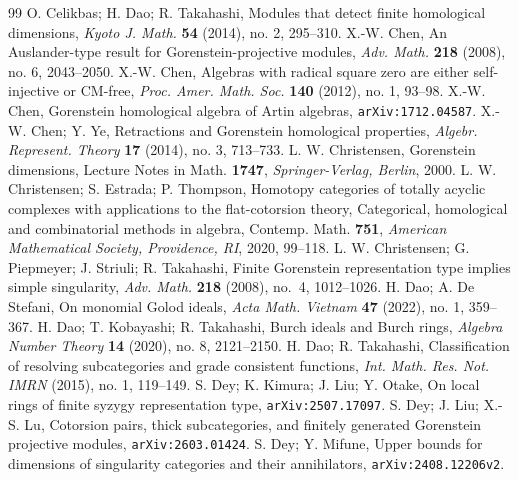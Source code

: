 \documentclass{amsart}
\theoremstyle{definition}
\theoremstyle{remark}
\numberwithin{equation}{thm}
\begin{document}
\begin{thebibliography}{99}
{\sc O. Celikbas; H. Dao; R. Takahashi}, Modules that detect finite homological dimensions, {\it Kyoto J. Math.} {\bf 54} (2014), no. 2, 295--310.
{\sc X.-W. Chen}, An Auslander-type result for Gorenstein-projective modules, {\it Adv. Math.} {\bf 218} (2008), no. 6, 2043--2050.
{\sc X.-W. Chen}, Algebras with radical square zero are either self-injective or CM-free, {\em Proc. Amer. Math. Soc.} {\bf 140} (2012), no. 1, 93--98.
{\sc X.-W. Chen}, Gorenstein homological algebra of Artin algebras, {\tt arXiv:1712.04587}.
{\sc X.-W. Chen; Y. Ye}, Retractions and Gorenstein homological properties, {\em Algebr. Represent. Theory} {\bf 17} (2014), no. 3, 713--733.
{\sc L. W. Christensen}, Gorenstein dimensions, Lecture Notes in Math. {\bf 1747}, {\em Springer-Verlag, Berlin}, 2000.
{\sc L. W. Christensen; S. Estrada; P. Thompson}, Homotopy categories of totally acyclic complexes with applications to the flat-cotorsion theory, Categorical, homological and combinatorial methods in algebra, Contemp. Math. {\bf 751}, {\em American Mathematical Society, Providence, RI}, 2020, 99--118.
{\sc L. W. Christensen; G. Piepmeyer; J. Striuli; R. Takahashi}, Finite Gorenstein representation type implies simple singularity, {\em Adv. Math.} {\bf 218} (2008), no.~4, 1012--1026.
{\sc H. Dao; A. De Stefani}, On monomial Golod ideals, {\em Acta Math. Vietnam} {\bf 47} (2022), no. 1, 359--367.
{\sc H. Dao; T. Kobayashi; R. Takahashi}, Burch ideals and Burch rings, {\em Algebra Number Theory} {\bf 14} (2020), no. 8, 2121--2150.
{\sc H. Dao; R. Takahashi}, Classification of resolving subcategories and grade consistent functions, {\em Int. Math. Res. Not. IMRN} (2015), no. 1, 119--149.
{\sc S. Dey; K. Kimura; J. Liu; Y. Otake}, On local rings of finite syzygy representation type, {\tt arXiv:2507.17097}.
{\sc S. Dey; J. Liu; X.-S. Lu}, Cotorsion pairs, thick subcategories, and finitely generated Gorenstein projective modules, {\tt arXiv:2603.01424}.
{\sc S. Dey; Y. Mifune}, Upper bounds for dimensions of singularity categories and their annihilators, {\tt arXiv:2408.12206v2}.

\end{thebibliography}
\end{document}
